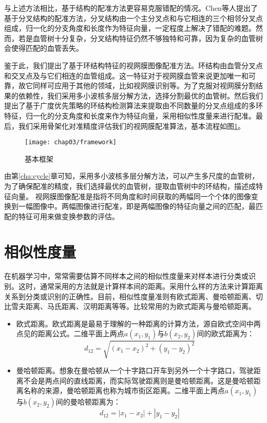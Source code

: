 与上述方法相比，基于结构的配准方法更容易克服错配的情况。Chen\cite{chen2011retinal,chen2015retinal}等人提出了基于分叉结构的配准方法，分叉结构由一个主分叉点和与它相连的三个相邻分叉点组成，归一化的分支角度和长度作为特征向量，一定程度上解决了错配的难题。然而，若是血管树十分复杂，分叉结构特征仍然不够独特和可靠，因为复杂的血管树会使得匹配的血管丢失。

鉴于此，我们提出了基于环结构特征的视网膜图像配准方法。环结构由血管分叉点和交叉点及与它们相连的血管组成。这一特征对于视网膜血管来说更加唯一和可靠，故它同样可应用于其他的领域，比如视网膜识别等。为了克服对视网膜分割结果的依赖性，我们采用多小波核多层分解方法，选择分割最优的血管树。然后我们提出了基于广度优先策略的环结构检测算法来提取由不同数量的分叉点组成的多环特征，归一化的分支角度和长度来作为特征向量，采用相似性度量来进行配准。最后，我们采用骨架化对准精度评估我们的视网膜配准算法，基本流程如图\ref{fig:framework}。
\begin{figure}
  \centering
  \texttt{[image: chap03/framework]}
  \caption{基本框架}
  \label{fig:framework}
\end{figure}


由第\ref{cha:cycle}章可知，采用多小波核多层分解方法，可以产生多尺度的血管树，为了确保配准的精度，我们选择最优的血管树，提取血管树中的环结构，描述成特征向量。
视网膜图像配准是指将不同角度和时间获取的两幅同一个个体的图像变换到一幅图像中。两幅图像进行配准，即是两幅图像的特征向量之间的匹配，最匹配的特征可用来做变换参数的评估。


\section{相似性度量}
\label{cha:similarity}

在机器学习中，常常需要估算不同样本之间的相似性度量来对样本进行分类或识别。这时，通常采用的方法就是计算样本间的距离。采用什么样的方法来计算距离关系到分类或识别的正确性。目前，相似性度量准则有欧式距离、曼哈顿距离、切比雪夫距离、马氏距离、汉明距离等等。比较常用的为欧式距离与曼哈顿距离。

\begin{itemize}
\item 欧式距离。欧式距离是最易于理解的一种距离的计算方法，源自欧式空间中两点见的距离公式。二维平面上两点$a(x_1,y_1)$与$b(x_2,y_2)$间的欧式距离为：
\begin{equation}
d_{12}=\sqrt{(x_1-x_2)^2+(y_1-y_2)^2}
\end{equation}
\item 曼哈顿距离。想象在曼哈顿从一个十字路口开车到另外一个十字路口，驾驶距离不会是两点间的直线距离，而实际驾驶距离则是曼哈顿距离。这是曼哈顿距离名称的来源，曼哈顿距离也称为城市街区距离。二维平面上两点$a(x_1,y_1)$与$b(x_2,y_2)$间的曼哈顿距离为：
\begin{equation}
d_{12}=|x_1-x_2|+|y_1-y_2|
\end{equation}
\end{itemize}

